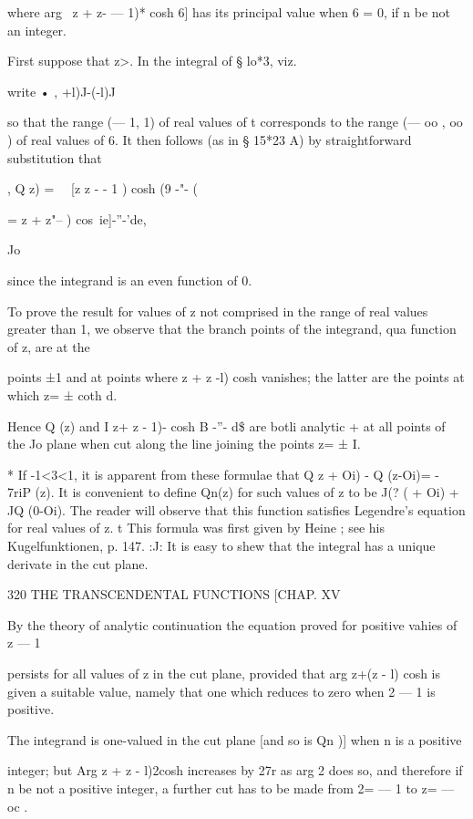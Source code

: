 {{where arg \ z + z- — 1)* cosh 6] has its principal value when 6 = 0,
if n be not an integer.

First suppose that z>. In the integral of § lo*3, viz.

write • , +l)J-(-l)J

so that the range (— 1, 1) of real values of t corresponds to the
range (— oo , oo ) of real values of 6. It then follows (as in § 15*23
A) by straightforward substitution that



, Q z) = \ \ [z z - - 1 ) cosh (9 -"- (

= z + z"-- ) cos\ ie]-''-'de,

Jo



since the integrand is an even function of 0.

To prove the result for values of z not comprised in the range of real
values greater than 1, we observe that the branch points of the
integrand, qua function of z, are at the

points ±1 and at points where z + z -l) cosh vanishes; the latter are
the points at which z= ± coth d.

Hence Q (z) and I z+ z - 1)- cosh B -''- d\$ are botli analytic + at
all points of the Jo plane when cut along the line joining the points
z= ± I.

* If -1<3<1, it is apparent from these formulae that Q z + Oi) - Q
(z-Oi)= - 7riP (z). It is convenient to define Qn(z) for such values
of z to be J(? ( + Oi) + JQ (0-Oi). The reader will observe that this
function satisfies Legendre's equation for real values of z. t This
formula was first given by Heine ; see his Kugelfunktionen, p. 147.
:J: It is easy to shew that the integral has a unique derivate in the
cut plane.



320 THE TRANSCENDENTAL FUNCTIONS [CHAP. XV

By the theory of analytic continuation the equation proved for
positive vahies of z — 1

persists for all values of z in the cut plane, provided that arg z+(z
- l) cosh is given a suitable value, namely that one which reduces to
zero when 2 — 1 is positive.

The integrand is one-valued in the cut plane [and so is Qn )] when n
is a positive

integer; but Arg z + z - l)2cosh increases by 27r as arg 2 does so,
and therefore if n be not a positive integer, a further cut has to be
made from 2= — 1 to z= — oc .

}}
